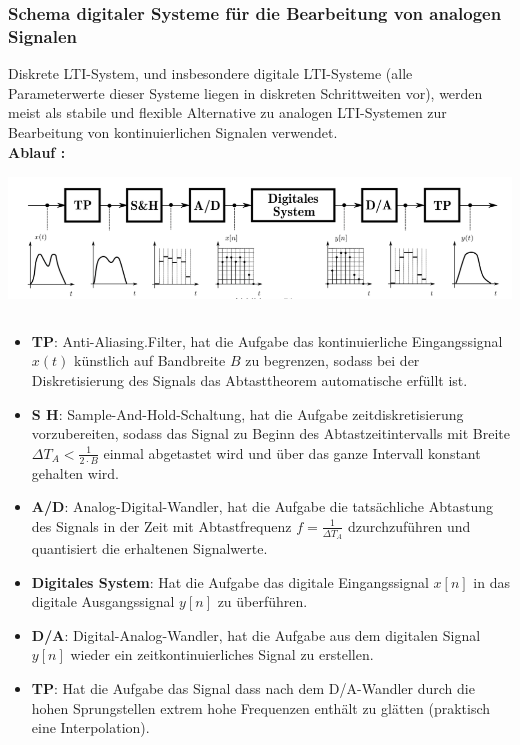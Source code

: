 \documentclass[12pt,a4paper]{scrartcl}
\begin{document}
  \subsubsection{Schema digitaler Systeme für die Bearbeitung von analogen Signalen}
  \label{sec:sub:sub:schema-digital-bearbeitung-analog}
  
  \noindent Diskrete LTI-System, und insbesondere digitale LTI-Systeme (alle Parameterwerte dieser Systeme liegen in diskreten Schrittweiten vor), werden meist als stabile und flexible Alternative zu analogen LTI-Systemen zur Bearbeitung von kontinuierlichen Signalen verwendet. \\

  \noindent \textbf{Ablauf :} \\
  \includegraphics[height=4cm]{Pictures/Pipeline.png}
  \begin{itemize}
    \item \textbf{TP}: Anti-Aliasing.Filter, hat die Aufgabe das kontinuierliche Eingangssignal $x(t)$ künstlich auf Bandbreite $B$ zu begrenzen, sodass bei der Diskretisierung des Signals das Abtasttheorem automatische erfüllt ist.
    \item \textbf{S H}: Sample-And-Hold-Schaltung, hat die Aufgabe zeitdiskretisierung vorzubereiten, sodass das Signal zu Beginn des Abtastzeitintervalls mit Breite $\Delta T_A < \frac{1}{2\cdot B}$ einmal abgetastet wird und über das ganze Intervall konstant gehalten wird.
    \item \textbf{A/D}: Analog-Digital-Wandler, hat die Aufgabe die tatsächliche Abtastung des Signals in der Zeit mit Abtastfrequenz $f = \frac{1}{\Delta T_A}$ dzurchzuführen und quantisiert die erhaltenen Signalwerte.
    \item \textbf{Digitales System}: Hat die Aufgabe das digitale Eingangssignal $x[n]$ in das digitale Ausgangssignal $y[n]$ zu überführen.
    \item \textbf{D/A}: Digital-Analog-Wandler, hat die Aufgabe aus dem digitalen Signal $y[n]$ wieder ein zeitkontinuierliches Signal zu erstellen.
    \item \textbf{TP}: Hat die Aufgabe das Signal dass nach dem D/A-Wandler durch die hohen Sprungstellen extrem hohe Frequenzen enthält zu glätten (praktisch eine Interpolation). 
  \end{itemize}
\end{document}
